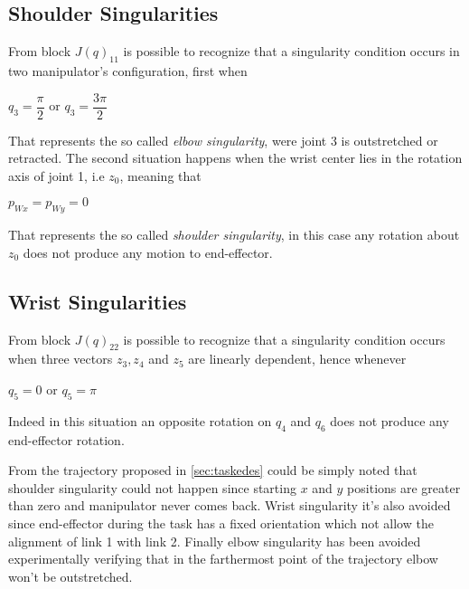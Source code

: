 \subsection{Shoulder Singularities}
From block $J(q)_{11}$ is possible to recognize that a singularity condition occurs in two manipulator's configuration, first when
\begin{center}
$q_3 = \dfrac{\pi}{2}$ or $q_3 = \dfrac{3\pi}{2}$
\end{center} 
That represents the so called \textit{elbow singularity}, were joint 3 is outstretched or retracted. The second situation happens when the wrist center lies in the rotation axis of joint 1, i.e $z_0$, meaning that 
\begin{center}
$p_{Wx} = p_{Wy} = 0$	
\end{center}
That represents the so called \textit{shoulder singularity}, in this case any rotation about $z_0$ does not produce any motion to end-effector.

\subsection{Wrist Singularities}

From block $J(q)_{22}$ is possible to recognize that a singularity condition occurs when three vectors $z_3, z_4$ and $z_5$ are linearly dependent, hence whenever 
\begin{center}
$q_5 = 0$ or $q_5 = \pi$
\end{center}
Indeed in this situation an opposite rotation on $q_4$ and $q_6$ does not produce any end-effector rotation.

From the trajectory proposed in \ref{sec:taskedes} could be simply noted that shoulder singularity could not happen since starting $x$ and $y$ positions are greater than zero and manipulator never comes back. Wrist singularity it's also avoided since end-effector during the task has a fixed orientation which not allow the alignment of link 1 with link 2. Finally elbow singularity has been avoided experimentally verifying that in the farthermost point of the trajectory elbow won't be outstretched.
